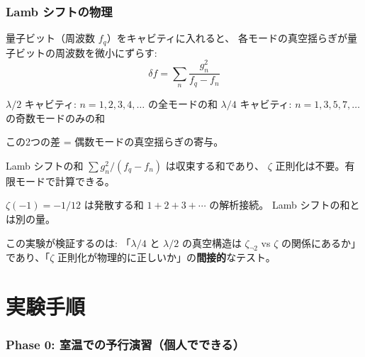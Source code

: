 \documentclass[12pt,a4paper]{article}
\begin{document}
\section{Lamb シフトの物理}

\begin{mathbox}
量子ビット（周波数 $f_q$）をキャビティに入れると、
各モードの真空揺らぎが量子ビットの周波数を微小にずらす:
$$\delta f = \sum_n \frac{g_n^2}{f_q - f_n}$$

$\lambda/2$ キャビティ: $n = 1, 2, 3, 4, \ldots$ の全モードの和
$\lambda/4$ キャビティ: $n = 1, 3, 5, 7, \ldots$ の奇数モードのみの和

この2つの差 = 偶数モードの真空揺らぎの寄与。
\end{mathbox}

\begin{honestbox}
Lamb シフトの和 $\sum g_n^2/(f_q - f_n)$ は収束する和であり、
$\zeta$ 正則化は不要。有限モードで計算できる。

$\zeta(-1) = -1/12$ は発散する和 $1+2+3+\cdots$ の解析接続。
Lamb シフトの和とは別の量。

この実験が検証するのは:
「$\lambda/4$ と $\lambda/2$ の真空構造は
 $\zeta_{\neg 2}$ vs $\zeta$ の関係にあるか」
であり、「$\zeta$ 正則化が物理的に正しいか」の\textbf{間接的}なテスト。
\end{honestbox}

\part{実験手順}

\section{Phase 0: 室温での予行演習（個人でできる）}
\end{document}
